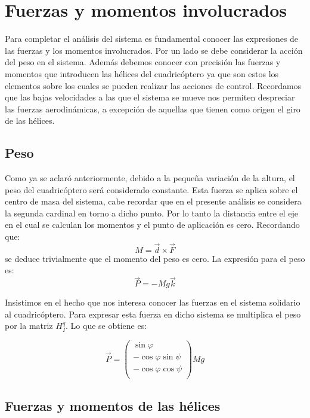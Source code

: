 \documentclass[main]{subfiles}
\begin{document}
\section{Fuerzas y momentos involucrados}
\label{FYT}

Para completar el an\'alisis del sistema es fundamental conocer las expresiones de las fuerzas y los momentos involucrados. Por un lado se debe considerar la acci\'on del peso en el sistema. Adem\'as debemos conocer con precisi\'on las fuerzas y momentos que introducen las h\'elices del cuadric\'optero ya que son estos los elementos sobre los cuales se pueden realizar las acciones de control. Recordamos que las bajas velocidades a las que el sistema se mueve nos permiten despreciar las fuerzas aerodin\'amicas, a excepci\'on de aquellas que tienen como origen el giro de las h\'elices.
\subsection{Peso}
Como ya se aclar\'o anteriormente, debido a la peque\~na variaci\'on de la altura, el peso del cuadric\'optero ser\'a considerado constante. Esta fuerza se aplica sobre el centro de masa del sistema, cabe recordar que en el presente an\'alisis se considera la segunda cardinal en torno a dicho punto. Por lo tanto la distancia entre el eje en el cual se calculan los momentos y el punto de aplicaci\'on es cero. Recordando que: $$
M=\vec{d}\times\vec{F}
$$
se deduce trivialmente que el momento del peso es cero. La expresi\'on para el peso es:
$$
\vec{P}=-Mg\vec{k}
$$

Insistimos en el hecho que nos interesa conocer las fuerzas en el sistema solidario al cuadric\'optero. Para expresar esta fuerza en dicho sistema se multiplica el peso por la matriz $H_I^q$. Lo que se obtiene es:

$$
\vec{P}=\left(\begin{array}{c}
\sin\varphi\\
-\cos\varphi\sin\psi\\
-\cos\varphi\cos\psi\\
\end{array}\right)Mg
$$
\subsection{Fuerzas y momentos de las h\'elices}
\end{document}
